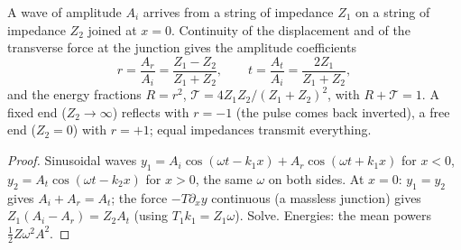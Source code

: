 \begin{proposition}\label{prop:b2:waves-on-strings:junction}
A wave of amplitude $A_i$ arrives from a string of impedance $Z_1$ on
a string of impedance $Z_2$ joined at $x = 0$. Continuity of the
displacement and of the transverse force at the junction gives the
amplitude coefficients
\[
r = \frac{A_r}{A_i} = \frac{Z_1 - Z_2}{Z_1 + Z_2} , \qquad
t = \frac{A_t}{A_i} = \frac{2Z_1}{Z_1 + Z_2} ,
\]
and the energy fractions $R = r^2$, $\mathcal T = 4Z_1Z_2/(Z_1 + Z_2)^2$, with
$R + \mathcal T = 1$. A fixed end ($Z_2 \to \infty$) reflects with $r = -1$
(the pulse comes back inverted), a free end ($Z_2 = 0$) with $r = +1$;
equal impedances transmit everything.
\end{proposition}

\begin{proof}
Sinusoidal waves $y_1 = A_i\cos(\omega t - k_1x) + A_r\cos(\omega t + k_1x)$ for
$x < 0$, $y_2 = A_t\cos(\omega t - k_2x)$ for $x > 0$, the same $\omega$ on both
sides. At $x = 0$: $y_1 = y_2$ gives $A_i + A_r = A_t$; the force $-T\partial_xy$
continuous (a massless junction) gives $Z_1(A_i - A_r) = Z_2A_t$ (using
$T_1k_1 = Z_1\omega$). Solve. Energies: the mean powers $\tfrac12Z\omega^2A^2$.
\end{proof}

